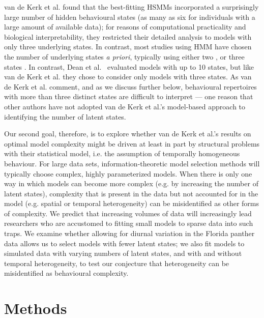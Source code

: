 \documentclass{bmcart}
\begin{document}
van de Kerk et al. \cite{kerk2015hidden} found that the best-fitting HSMMs
incorporated a surprisingly large number of hidden
behavioural states (as many as six for individuals with a large amount
of available data); for reasons of computational 
practicality and biological interpretability, they restricted their
detailed analysis to models with only three underlying states.  In
contrast, most studies using HMM have chosen the
number of underlying states \emph{a priori}, typically using either two
\cite{schliehe-diecks_application_2012,mckellar_using_2014,langrock_flexible_2012,fryxell_multiple_2008}, or three states
\cite{dean2012behavioural,morales_extracting_2004,franke_prediction_2006}. 
In contrast, Dean et al.~\cite{dean2012behavioural} evaluated models with up to 10
states, but like van de Kerk et al. they chose to consider only 
models with three states. 
As van de Kerk et al. \cite{kerk2015hidden} comment, and as
we discuss further below, behavioural
repertoires with more than three distinct states are difficult to
interpret --- one reason that other authors have not adopted
van de Kerk et al.'s model-based approach to
identifying the number of latent states.

Our second goal, therefore, is to explore whether
van de Kerk et al.'s results on optimal
model complexity might be driven at
least in part by structural problems with their statistical
model, i.e. the
assumption of temporally homogeneous behaviour.  For large data sets, 
information-theoretic model selection methods will
typically choose complex, highly parameterized models. When there is
only one way in which models can become more complex (e.g. by
increasing the number of latent states), complexity that is
present in the data but not accounted for in the model (e.g. spatial
or temporal heterogeneity) can be misidentified as other forms of
complexity.  We predict that increasing volumes of data will
increasingly lead researchers who are accustomed to fitting 
small models to sparse data into such traps.  We examine whether
allowing for diurnal variation in the Florida panther data allows us to
select models with fewer latent states; we also
fit models to simulated data with varying numbers of latent states,
and with and without temporal heterogeneity, to test our conjecture that
heterogeneity can be misidentified as behavioural complexity.

\section*{Methods}
\end{document}
